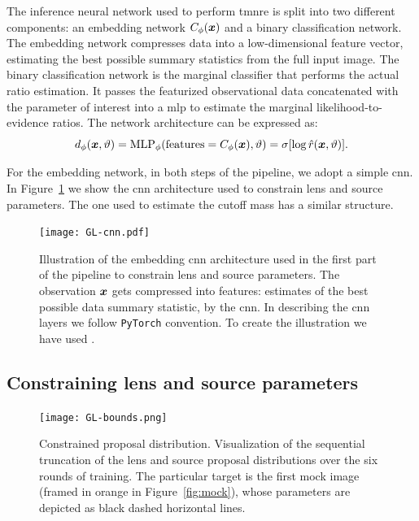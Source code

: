 The inference neural network used to perform \gls*{tmnre} is split into two different components: an embedding network $C_\phi(\bm{x})$ and a binary classification network. 
The embedding network compresses data into a low-dimensional feature vector, estimating the best possible summary statistics from the full input image. 
The binary classification network is the marginal classifier that performs the actual ratio estimation. It passes the featurized observational data concatenated with the parameter of interest into a \gls*{mlp} to estimate the marginal likelihood-to-evidence ratios.
The network architecture can be expressed as:
\begin{equation}
    d_\phi(\bm{x}, \vartheta) = \mathrm{MLP}_\phi(\text{features} = C_\phi(\bm{x}), \vartheta) = \sigma[ \log \hat{r}(\bm{x}, \vartheta)].
\end{equation}

For the embedding network, in both steps of the pipeline, we adopt a simple \gls*{cnn}. In Figure~\ref{fig:cnn} we show the \gls*{cnn} architecture used to constrain lens and source parameters. The one used to estimate the cutoff mass has a similar structure.

\begin{figure}
\centering
\texttt{[image: GL-cnn.pdf]}
\caption{Illustration of the embedding \gls*{cnn} architecture used in the first part of the pipeline to constrain lens and source parameters. The observation $\bm{x}$ gets compressed into features: estimates of the best possible data summary statistic, by the \gls*{cnn}. In describing the \gls*{cnn} layers we follow \texttt{PyTorch} \citep{pytorch} convention. To create the illustration we have used \cite{PlotNeuralNet}.
}
\label{fig:cnn}
\end{figure}


\subsection{Constraining lens and source parameters}\label{subsec:constrain}

\begin{figure}
\centering
\texttt{[image: GL-bounds.png]}
\caption{Constrained proposal distribution. Visualization of the sequential truncation of the lens and source proposal distributions over the six rounds of training. The particular target is the first mock image (framed in orange in Figure~\ref{fig:mock}), whose parameters are depicted as black dashed horizontal lines.
}
\label{fig:bounds}
\end{figure}

